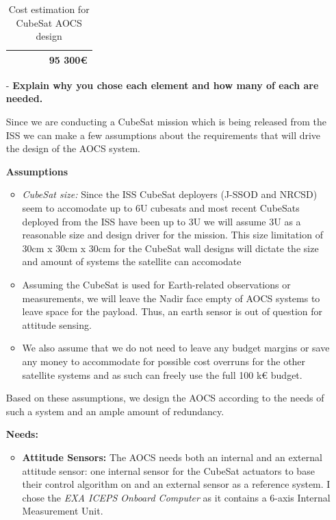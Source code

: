 \begin{itemize}
\begin{table}[h]
\begin{tabular}{|l|c|c|c|c|}
        \hline
        & & & &\textbf{95 300€}\\ \hline
        \end{tabular}
        \caption{Cost estimation for CubeSat AOCS design}
        \label{tab:my_label}
    \end{table}


    \newpage
    \item[-] \textbf{Explain why you chose each element and how many of each are needed. }

    Since we are conducting a CubeSat mission which is being released from the ISS we can make a few assumptions about the requirements that will drive the design of the AOCS system.

    \textbf{Assumptions}
    \begin{itemize}
        \item \textit{CubeSat size:} Since the ISS CubeSat deployers (J-SSOD and NRCSD) seem to accomodate up to 6U \cite{deployers_wiki} cubesats and most recent CubeSats deployed from the ISS \cite{nanosats_database} have been up to 3U we will assume 3U as a reasonable size and design driver for the mission.
        This size limitation of 30cm x 30cm x 30cm for the CubeSat wall designs will dictate the size and amount of systems the satellite can accomodate

        \item Assuming the CubeSat is used for Earth-related observations or measurements, we will leave the Nadir face empty of AOCS systems to leave space for the payload.
        Thus, an earth sensor is out of question for attitude sensing.

        \item We also assume that we do not need to leave any budget margins or save any money to accommodate for possible cost overruns for the other satellite systems and as such can freely use the full 100 k€ budget.
    \end{itemize}

    \vspace{1cm}
    Based on these assumptions, we design the AOCS according to the needs of such a system and an ample amount of redundancy.
    
    \textbf{Needs:}
    \begin{itemize}
        \item \textbf{Attitude Sensors:}
        The AOCS needs both an internal and an external attitude sensor: one internal sensor for the CubeSat actuators to base their control algorithm on and an external sensor as a reference system. 
        I chose the \textit{EXA ICEPS Onboard Computer} as it contains a 6-axis Internal Measurement Unit.
        

\end{itemize}
\end{itemize}

